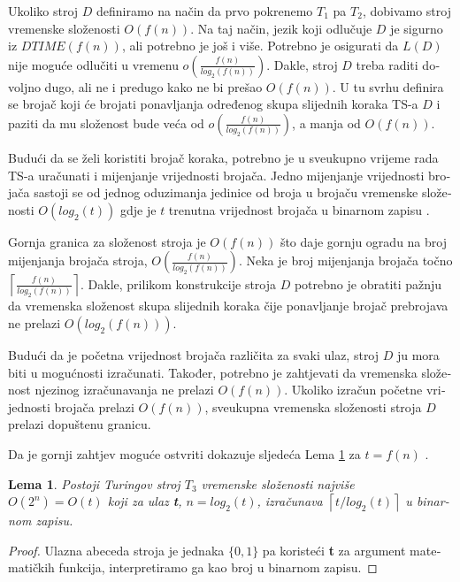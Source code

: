 \documentclass[12pt]{rectors}
\newtheorem{lemma}[theorem]{Lema}
\begin{document}
\begin{otherlanguage}{croatian}
Ukoliko stroj $D$ definiramo na način da prvo pokrenemo $T_1$ pa $T_2$,
dobivamo stroj vremenske složenosti $O(f(n))$.
Na taj način, jezik koji odlučuje $D$ je sigurno iz $DTIME(f(n))$, ali potrebno je još i više. Potrebno je osigurati da $L(D)$  nije moguće odlučiti u vremenu $o( \frac {f\left ( n \right )}{log_2\left ( f\left ( n \right ) \right )})$. 
Dakle, stroj $D$ treba raditi dovoljno dugo, ali ne i predugo kako ne bi prešao $O(f(n))$.
U tu svrhu definira se brojač koji će brojati ponavljanja određenog skupa slijednih koraka TS-a $D$ i paziti da mu složenost bude veća od $o( \frac {f\left ( n \right )}{log_2\left ( f\left ( n \right ) \right )})$, a manja od $O(f(n))$.

Budući da se želi koristiti brojač koraka, potrebno je u sveukupno vrijeme rada TS-a
uračunati i mijenjanje vrijednosti brojača. Jedno mijenjanje vrijednosti brojača sastoji se od jednog oduzimanja jedinice od broja u brojaču vremenske složenosti
$O(log_2(t))$ gdje je $t$ trenutna vrijednost brojača u binarnom zapisu \cite{counterCop,counterCop2}.


Gornja granica za složenost stroja je $O(f(n))$ što daje gornju ogradu na broj mijenjanja brojača stroja, $O(\frac {f\left ( n \right )}{log_2\left ( f\left ( n \right ) \right )})$. Neka je broj mijenjanja brojača točno $\left \lceil \frac {f\left ( n \right )}{log_2\left ( f\left ( n \right ) \right )} \right \rceil$\label{broj_koraka}.
Dakle, prilikom konstrukcije stroja $D$ potrebno je obratiti pažnju
da vremenska složenost skupa slijednih koraka čije ponavljanje brojač prebrojava ne prelazi $O(log_2(f(n)))$.

Budući da je početna vrijednost brojača različita za svaki ulaz, stroj $D$ ju
mora biti u mogućnosti izračunati. Također, potrebno je zahtjevati da vremenska složenost
njezinog izračunavanja ne prelazi $O(f(n))$. Ukoliko izračun početne vrijednosti brojača prelazi 
$O(f(n))$, sveukupna vremenska složenosti stroja $D$ prelazi dopuštenu granicu.

Da je gornji zahtjev moguće ostvriti dokazuje sljedeća Lema \ref{lemma:t3} za $t=f(n)$ .
\begin{lemma}\label{lemma:t3}
Postoji Turingov stroj $T_3$ vremenske složenosti najviše $O(2^n) = O(t)$ koji za ulaz \textbf{t}, $n = log_2(t)$, izračunava $\left \lceil{ t/log_2(t) }\right \rceil$ u binarnom zapisu. 
\end{lemma}
\begin{proof}
Ulazna abeceda stroja je jednaka $\{0,1\}$ pa koristeći \textbf{t} za argument matematičkih funkcija, interpretiramo ga kao broj u binarnom zapisu. 	


\end{proof}
\end{otherlanguage}
\end{document}
